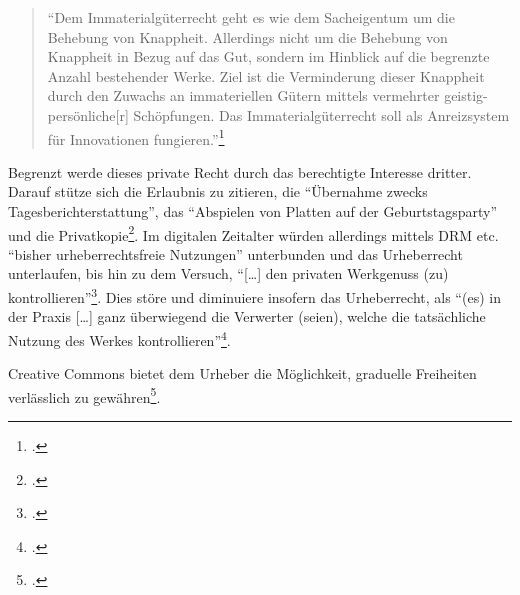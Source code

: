 \documentclass[DIV=calc,BCOR=5mm,11pt,headings=small,oneside,abstract=true, toc=bib]{scrartcl}
\begin{document}
\begin{quote}
\enquote{Dem Immaterialgüterrecht geht es wie dem Sacheigentum um die
Behebung von Knappheit. Allerdings nicht um die Behebung von Knappheit in
Bezug auf das Gut, sondern im Hinblick auf die begrenzte Anzahl
bestehender Werke. Ziel ist die Verminderung dieser Knappheit durch den
Zuwachs an immateriellen Gütern mittels vermehrter geistig-persönliche[r]
Schöpfungen. Das Immaterialgüterrecht soll als Anreizsystem für
Innovationen fungieren.}\footcite[][149 Fehler im Original]{Euler2006a}
\end{quote}

Begrenzt werde dieses private Recht durch das berechtigte Interesse dritter.
Darauf stütze sich die Erlaubnis zu zitieren, die \enquote{Übernahme zwecks
Tagesberichterstattung}, das \enquote{Abspielen von Platten auf der
Geburtstagsparty} und die Privatkopie\footcite[vgl.][149]{Euler2006a}. Im
digitalen Zeitalter würden allerdings mittels DRM etc. \enquote{bisher
urheberrechtsfreie Nutzungen} unterbunden und das Urheberrecht unterlaufen,
bis hin zu dem Versuch, \enquote{[\ldots] den privaten Werkgenuss (zu)
kontrollieren}\footcite[vgl.][151]{Euler2006a}. Dies störe und diminuiere
insofern das Urheberrecht, als \enquote{(es) in der Praxis [\ldots] ganz
überwiegend die Verwerter (seien), welche die tatsächliche Nutzung des
Werkes kontrollieren}\footcite[vgl.][152]{Euler2006a}.

Creative Commons bietet dem Urheber die Möglichkeit, graduelle Freiheiten
verlässlich zu gewähren\footcite[vgl. dazu][154f]{Euler2006a}.



\end{document}
